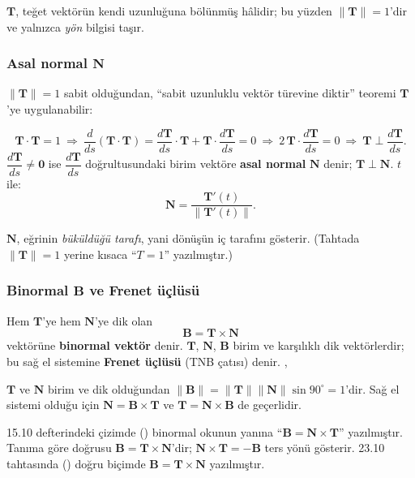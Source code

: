 $\mathbf T$, teğet vektörün kendi uzunluğuna bölünmüş hâlidir; bu yüzden $\|\mathbf T\|=1$'dir ve yalnızca \emph{yön} bilgisi taşır.

\subsubsection{Asal normal \texorpdfstring{$\mathbf N$}{N}}

$\|\mathbf T\|=1$ sabit olduğundan, ``sabit uzunluklu vektör türevine diktir'' teoremi $\mathbf T$'ye uygulanabilir:

\begin{tahta}
\[ \mathbf T\cdot\mathbf T=1\ \Rightarrow\ \frac{d}{ds}(\mathbf T\cdot\mathbf T)=\frac{d\mathbf T}{ds}\cdot\mathbf T+\mathbf T\cdot\frac{d\mathbf T}{ds}=0
\ \Rightarrow\ 2\,\mathbf T\cdot\frac{d\mathbf T}{ds}=0\ \Rightarrow\ \mathbf T\perp\frac{d\mathbf T}{ds}. \]
$\dfrac{d\mathbf T}{ds}\neq\mathbf 0$ ise $\dfrac{d\mathbf T}{ds}$ doğrultusundaki birim vektöre \textbf{asal normal} $\mathbf N$ denir; $\mathbf T\perp\mathbf N$.
$t$ ile:
\[ \mathbf N=\frac{\mathbf T'(t)}{\|\mathbf T'(t)\|} . \]
\end{tahta}

$\mathbf N$, eğrinin \emph{büküldüğü tarafı}, yani dönüşün iç tarafını gösterir. (Tahtada $\|\mathbf T\|=1$ yerine kısaca ``$T=1$''
yazılmıştır.)

\subsubsection{Binormal \texorpdfstring{$\mathbf B$}{B} ve Frenet üçlüsü}

\begin{tanim}
Hem $\mathbf T$'ye hem $\mathbf N$'ye dik olan
\[ \mathbf B=\mathbf T\times\mathbf N \]
vektörüne \textbf{binormal vektör} denir. $\mathbf T$, $\mathbf N$, $\mathbf B$ birim ve karşılıklı dik vektörlerdir; bu sağ el
sistemine \textbf{Frenet üçlüsü} (TNB çatısı) denir. , 
\end{tanim}

$\mathbf T$ ve $\mathbf N$ birim ve dik olduğundan $\|\mathbf B\|=\|\mathbf T\|\|\mathbf N\|\sin90^\circ=1$'dir. Sağ el sistemi
olduğu için $\mathbf N=\mathbf B\times\mathbf T$ ve $\mathbf T=\mathbf N\times\mathbf B$ de geçerlidir.

\begin{dikkat}
15.10 defterindeki çizimde () binormal okunun yanına ``$\mathbf B=\mathbf N\times\mathbf T$'' yazılmıştır.
Tanıma göre doğrusu $\mathbf B=\mathbf T\times\mathbf N$'dir; $\mathbf N\times\mathbf T=-\mathbf B$ ters yönü gösterir. 23.10
tahtasında () doğru biçimde $\mathbf B=\mathbf T\times\mathbf N$ yazılmıştır.
\end{dikkat}


